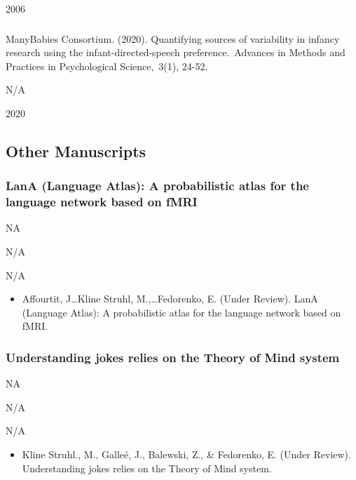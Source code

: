 \documentclass[
]{article}
\providecommand{\tightlist}{%
  \setlength{\itemsep}{0pt}\setlength{\parskip}{0pt}}
\begin{document}
2006

\hypertarget{section-11}{%
\subsubsection{}\label{section-11}}

ManyBabies Consortium. (2020). Quantifying sources of variability in
infancy research using the infant-directed-speech preference.~Advances
in Methods and Practices in Psychological Science,~3(1), 24-52.

N/A

2020

\hypertarget{other-manuscripts}{%
\subsection{Other Manuscripts}\label{other-manuscripts}}

\hypertarget{lana-language-atlas-a-probabilistic-atlas-for-the-language-network-based-on-fmri}{%
\subsubsection{LanA (Language Atlas): A probabilistic atlas for the
language network based on
fMRI}\label{lana-language-atlas-a-probabilistic-atlas-for-the-language-network-based-on-fmri}}

NA

N/A

N/A

\begin{itemize}
\tightlist
\item
  Affourtit, J\ldots Kline Struhl, M.,\ldots Fedorenko, E. (Under
  Review). LanA (Language Atlas): A probabilistic atlas for the language
  network based on fMRI.
\end{itemize}

\hypertarget{understanding-jokes-relies-on-the-theory-of-mind-system}{%
\subsubsection{Understanding jokes relies on the Theory of Mind
system}\label{understanding-jokes-relies-on-the-theory-of-mind-system}}

NA

N/A

N/A

\begin{itemize}
\tightlist
\item
  Kline Struhl., M., Galleé, J., Balewski, Z., \& Fedorenko, E. (Under
  Review). Understanding jokes relies on the Theory of Mind system.
\end{itemize}
\end{document}
